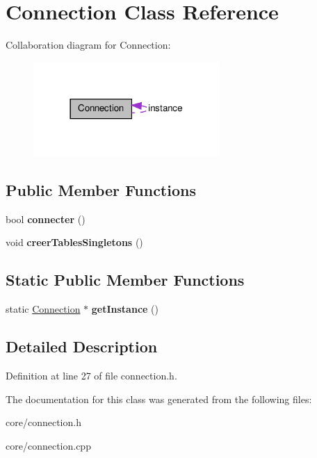 \hypertarget{class_connection}{
\section{Connection Class Reference}
\label{dd/d10/class_connection}
}


Collaboration diagram for Connection:\nopagebreak
\begin{figure}[H]
\begin{center}
\leavevmode
\includegraphics[width=201pt]{dc/d4c/class_connection__coll__graph}
\end{center}
\end{figure}
\subsection*{Public Member Functions}
\begin{DoxyCompactItemize}
\item 
\hypertarget{class_connection_aa7f45a931977be941e3f02633e458b32}{
bool {\bfseries connecter} ()}
\label{dd/d10/class_connection_aa7f45a931977be941e3f02633e458b32}

\item 
\hypertarget{class_connection_a6f462b425927fa14e6e5fb5976d1a428}{
void {\bfseries creerTablesSingletons} ()}
\label{dd/d10/class_connection_a6f462b425927fa14e6e5fb5976d1a428}

\end{DoxyCompactItemize}
\subsection*{Static Public Member Functions}
\begin{DoxyCompactItemize}
\item 
\hypertarget{class_connection_a3146d676185877bb2931fc3f8b96c5e4}{
static \hyperlink{class_connection}{Connection} $\ast$ {\bfseries getInstance} ()}
\label{dd/d10/class_connection_a3146d676185877bb2931fc3f8b96c5e4}

\end{DoxyCompactItemize}


\subsection{Detailed Description}


Definition at line 27 of file connection.h.



The documentation for this class was generated from the following files:\begin{DoxyCompactItemize}
\item 
core/connection.h\item 
core/connection.cpp\end{DoxyCompactItemize}
